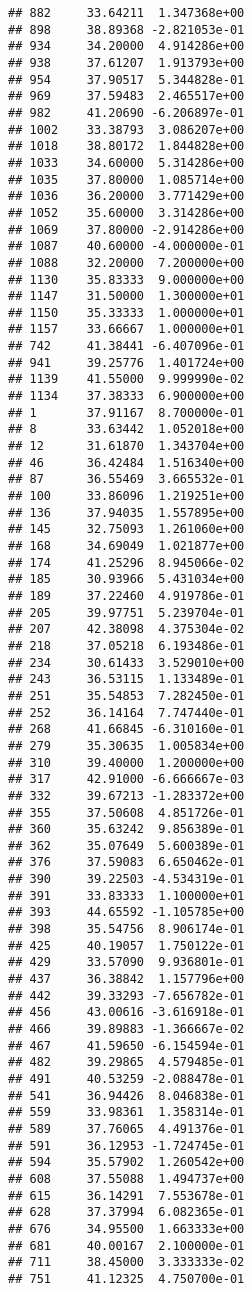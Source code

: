 \documentclass[
]{article}
\begin{document}
\begin{verbatim}
## 882     33.64211  1.347368e+00
## 898     38.89368 -2.821053e-01
## 934     34.20000  4.914286e+00
## 938     37.61207  1.913793e+00
## 954     37.90517  5.344828e-01
## 969     37.59483  2.465517e+00
## 982     41.20690 -6.206897e-01
## 1002    33.38793  3.086207e+00
## 1018    38.80172  1.844828e+00
## 1033    34.60000  5.314286e+00
## 1035    37.80000  1.085714e+00
## 1036    36.20000  3.771429e+00
## 1052    35.60000  3.314286e+00
## 1069    37.80000 -2.914286e+00
## 1087    40.60000 -4.000000e-01
## 1088    32.20000  7.200000e+00
## 1130    35.83333  9.000000e+00
## 1147    31.50000  1.300000e+01
## 1150    35.33333  1.000000e+01
## 1157    33.66667  1.000000e+01
## 742     41.38441 -6.407096e-01
## 941     39.25776  1.401724e+00
## 1139    41.55000  9.999990e-02
## 1134    37.38333  6.900000e+00
## 1       37.91167  8.700000e-01
## 8       33.63442  1.052018e+00
## 12      31.61870  1.343704e+00
## 46      36.42484  1.516340e+00
## 87      36.55469  3.665532e-01
## 100     33.86096  1.219251e+00
## 136     37.94035  1.557895e+00
## 145     32.75093  1.261060e+00
## 168     34.69049  1.021877e+00
## 174     41.25296  8.945066e-02
## 185     30.93966  5.431034e+00
## 189     37.22460  4.919786e-01
## 205     39.97751  5.239704e-01
## 207     42.38098  4.375304e-02
## 218     37.05218  6.193486e-01
## 234     30.61433  3.529010e+00
## 243     36.53115  1.133489e-01
## 251     35.54853  7.282450e-01
## 252     36.14164  7.747440e-01
## 268     41.66845 -6.310160e-01
## 279     35.30635  1.005834e+00
## 310     39.40000  1.200000e+00
## 317     42.91000 -6.666667e-03
## 332     39.67213 -1.283372e+00
## 355     37.50608  4.851726e-01
## 360     35.63242  9.856389e-01
## 362     35.07649  5.600389e-01
## 376     37.59083  6.650462e-01
## 390     39.22503 -4.534319e-01
## 391     33.83333  1.100000e+01
## 393     44.65592 -1.105785e+00
## 398     35.54756  8.906174e-01
## 425     40.19057  1.750122e-01
## 429     33.57090  9.936801e-01
## 437     36.38842  1.157796e+00
## 442     39.33293 -7.656782e-01
## 456     43.00616 -3.616918e-01
## 466     39.89883 -1.366667e-02
## 467     41.59650 -6.154594e-01
## 482     39.29865  4.579485e-01
## 491     40.53259 -2.088478e-01
## 541     36.94426  8.046838e-01
## 559     33.98361  1.358314e-01
## 589     37.76065  4.491376e-01
## 591     36.12953 -1.724745e-01
## 594     35.57902  1.260542e+00
## 608     37.55088  1.494737e+00
## 615     36.14291  7.553678e-01
## 628     37.37994  6.082365e-01
## 676     34.95500  1.663333e+00
## 681     40.00167  2.100000e-01
## 711     38.45000  3.333333e-02
## 751     41.12325  4.750700e-01

\end{verbatim}
\end{document}

